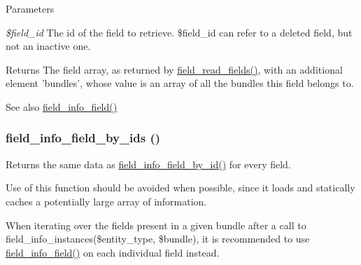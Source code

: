 \begin{DoxyParams}{Parameters}
\item[{\em \$field\_\-id}]The id of the field to retrieve. \$field\_\-id can refer to a deleted field, but not an inactive one.\end{DoxyParams}
\begin{DoxyReturn}{Returns}
The field array, as returned by \hyperlink{group__field__crud_ga0dae5c311ea301668c8906d2711fb3c5}{field\_\-read\_\-fields()}, with an additional element 'bundles', whose value is an array of all the bundles this field belongs to.
\end{DoxyReturn}
\begin{DoxySeeAlso}{See also}
\hyperlink{group__field__info_ga74cfc942cd2baa5c49780b08c5d357d4}{field\_\-info\_\-field()} 
\end{DoxySeeAlso}
\hypertarget{group__field__info_ga56b4320178a4409663a3de20b2483e99}{
\subsubsection[{field\_\-info\_\-field\_\-by\_\-ids}]{\setlength{\rightskip}{0pt plus 5cm}field\_\-info\_\-field\_\-by\_\-ids ()}}
\label{group__field__info_ga56b4320178a4409663a3de20b2483e99}
Returns the same data as \hyperlink{group__field__info_ga901d91feefc6639d0ad97289ae472523}{field\_\-info\_\-field\_\-by\_\-id()} for every field.

Use of this function should be avoided when possible, since it loads and statically caches a potentially large array of information.

When iterating over the fields present in a given bundle after a call to field\_\-info\_\-instances(\$entity\_\-type, \$bundle), it is recommended to use \hyperlink{group__field__info_ga74cfc942cd2baa5c49780b08c5d357d4}{field\_\-info\_\-field()} on each individual field instead.

